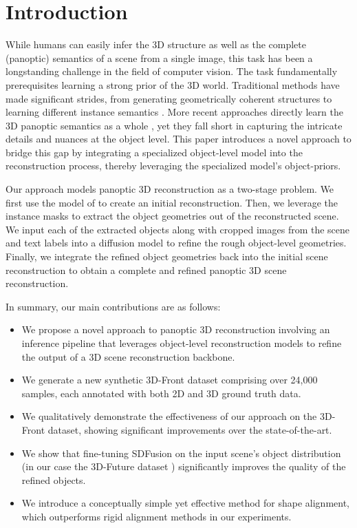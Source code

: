 \section{Introduction}
\label{sec:intro}


While humans can easily infer the 3D structure as well as the complete (panoptic) semantics of a scene from a single image, this task has been a longstanding
challenge in the field of computer vision. The task fundamentally prerequisites learning a strong prior of the 3D world. Traditional methods have made significant strides,
from generating geometrically coherent structures \citep{denninger20203d, shin20193d} to learning different instance semantics \citep{gkioxari2019mesh, kuo2020mask2cad,
nie2020total3dunderstanding}. More recent approaches directly learn the 3D panoptic semantics as a whole \citep{dahnert2021panoptic, zhang2023uni}, yet they fall short in capturing the intricate details and nuances at the object level.
This paper introduces a novel approach to bridge this gap by integrating a specialized object-level model into the reconstruction process, thereby leveraging the specialized model's object-priors.

Our approach models panoptic 3D reconstruction as a two-stage problem. We first use the model of \citet{dahnert2021panoptic} to create an initial reconstruction. Then, we leverage the instance masks to extract the object geometries out of the reconstructed scene. We input each of the extracted objects along with cropped images from the scene and text labels into a diffusion model \citep{cheng2023sdfusion} to refine the rough object-level geometries.
Finally, we integrate the refined object geometries back into the initial scene reconstruction to obtain a complete and refined panoptic 3D scene reconstruction.

In summary, our main contributions are as follows:
\begin{itemize}
    \item We propose a novel approach to panoptic 3D reconstruction involving an inference pipeline that leverages object-level reconstruction models to refine the output of a 3D scene reconstruction backbone.
    \item We generate a new synthetic 3D-Front dataset comprising over 24,000 samples, each annotated with both 2D and 3D ground truth data.
    \item We qualitatively demonstrate the effectiveness of our approach on the 3D-Front \citep{fu20213d} dataset, showing significant improvements over the state-of-the-art.
    \item We show that fine-tuning SDFusion \citep{cheng2023sdfusion} on the input scene's object distribution (in our case the 3D-Future dataset \citep{fu20213e}) significantly improves the quality of the refined objects.
    \item We introduce a conceptually simple yet effective method for shape alignment, which outperforms rigid alignment methods in our experiments.
\end{itemize}
